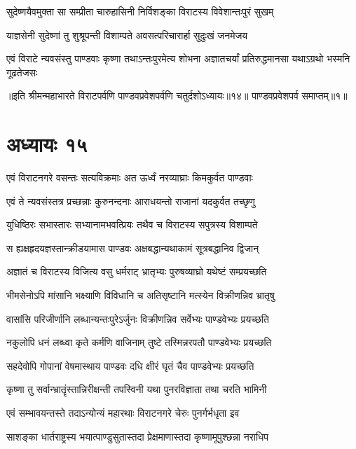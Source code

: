 
\twolineshloka
{सुदेष्णयैवमुक्ता सा सम्प्रीता चारुहासिनी}
{निर्विशङ्का विराटस्य विवेशान्तःपुरं सुखम्}


\twolineshloka
{याज्ञसेनी सुदेष्णां तु शुश्रूपन्ती विशाम्पते}
{अवसत्परिचारार्हा सुदुःखं जनमेजय}


\twolineshloka
{एवं विराटे न्यवसंस्तु पाण्डवाः कृष्णा तथाऽन्तःपुरमेत्य शोभना}
{अज्ञातचर्यां प्रतिरुद्धमानसा यथाऽग्रथो भस्मनि गूढतेजसः}

॥इति श्रीमन्महाभारते विराटपर्वणि पाण्डवप्रवेशपर्वणि चतुर्दशोऽध्यायः॥१४॥ पाण्डवप्रवेशपर्व समाप्तम्॥१॥

\chapter{अध्यायः १५}

\twolineshloka
{एवं विराटनगरे वसन्तः सत्यविक्रमाः}
{अत ऊर्ध्वं नरव्याघ्राः किमकुर्वत पाण्डवाः}



\twolineshloka
{एवं ते न्यवसंस्तत्र प्रच्छन्नाः कुरुनन्दनाः}
{आराधयन्तो राजानां यदकुर्वत तच्छृणु}


\twolineshloka
{युधिष्ठिरः सभास्तारः सभ्यानामभवत्प्रियः}
{तथैव च विराटस्य सपुत्रस्य विशाम्पते}


\twolineshloka
{स ह्यक्षहृदयज्ञस्तान्क्रीडयामास पाण्डवः}
{अक्षबद्धान्यथाकामं सूत्रबद्धानिव द्विजान्}


\twolineshloka
{अज्ञातं च विराटस्य विजित्य वसु धर्मराट्}
{भ्रातृभ्यः पुरुषव्याघ्रो यथेष्टं सम्प्रयच्छति}


\twolineshloka
{भीमसेनोऽपि मांसानि भक्ष्याणि विविधानि च}
{अतिसृष्टानि मत्स्येन विक्रीणन्निव भ्रातृषु}


\twolineshloka
{वासांसि परिजीर्णानि लब्धान्यन्तःपुरेऽर्जुनः}
{विक्रीणन्निव सर्वेभ्यः पाण्डवेभ्यः प्रयच्छति}


\twolineshloka
{नकुलोपि धनं लब्ध्वा कृते कर्मणि वाजिनाम्}
{तुष्टे तस्मिन्नरपतौ पाण्डवेभ्यः प्रयच्छति}


\twolineshloka
{सहदेवोपि गोपानां वेषमास्थाय पाण्डवः}
{दधि क्षीरं घृतं चैव पाण्डवेभ्यः प्रयच्छति}


\twolineshloka
{कृष्णा तु सर्वान्भ्रातॄंस्तान्निरीक्षन्ती तपस्विनी}
{यथा पुनरविज्ञाता तथा चरति भामिनी}


\twolineshloka
{एवं सम्भावयन्तस्ते तदाऽन्योन्यं महारथाः}
{विराटनगरे चेरुः पुनर्गर्भधृता इव}


\twolineshloka
{साशङ्का धार्तराष्ट्रस्य भयात्पाण्डुसुतास्तदा}
{प्रेक्षमाणास्तदा कृष्णामूपुश्छन्ना नराधिप}


